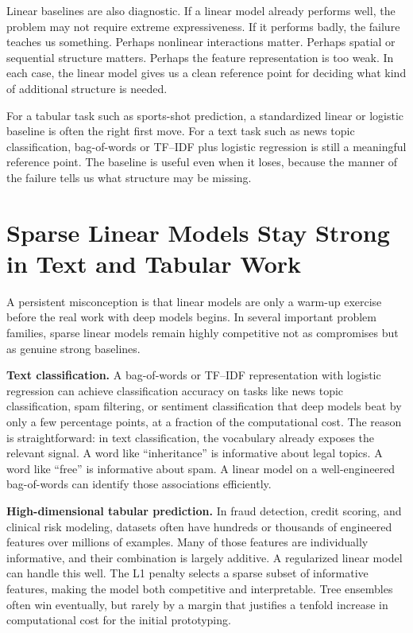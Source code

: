 Linear baselines are also diagnostic. If a linear model already performs well, the problem may not require extreme expressiveness. If it performs badly, the failure teaches us something. Perhaps nonlinear interactions matter. Perhaps spatial or sequential structure matters. Perhaps the feature representation is too weak. In each case, the linear model gives us a clean reference point for deciding what kind of additional structure is needed.

\begin{example}
For a tabular task such as sports-shot prediction, a standardized linear or logistic baseline is often the right first move. For a text task such as news topic classification, bag-of-words or TF--IDF plus logistic regression is still a meaningful reference point. The baseline is useful even when it loses, because the manner of the failure tells us what structure may be missing.
\end{example}

\section{Sparse Linear Models Stay Strong in Text and Tabular Work}

A persistent misconception is that linear models are only a warm-up exercise before the real work with deep models begins. In several important problem families, sparse linear models remain highly competitive not as compromises but as genuine strong baselines.

\textbf{Text classification.} A bag-of-words or TF--IDF representation with logistic regression can achieve classification accuracy on tasks like news topic classification, spam filtering, or sentiment classification that deep models beat by only a few percentage points, at a fraction of the computational cost. The reason is straightforward: in text classification, the vocabulary already exposes the relevant signal. A word like ``inheritance'' is informative about legal topics. A word like ``free'' is informative about spam. A linear model on a well-engineered bag-of-words can identify those associations efficiently.

\textbf{High-dimensional tabular prediction.} In fraud detection, credit scoring, and clinical risk modeling, datasets often have hundreds or thousands of engineered features over millions of examples. Many of those features are individually informative, and their combination is largely additive. A regularized linear model can handle this well. The L1 penalty selects a sparse subset of informative features, making the model both competitive and interpretable. Tree ensembles often win eventually, but rarely by a margin that justifies a tenfold increase in computational cost for the initial prototyping.

